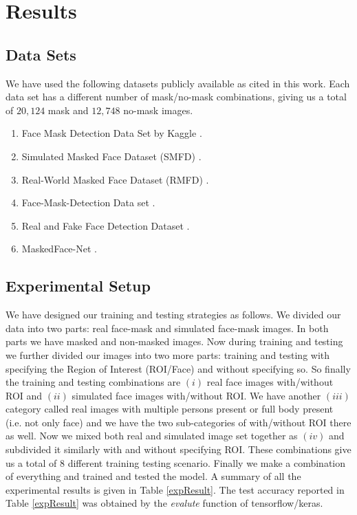 \documentclass{svproc}
\begin{document}
\section{Results}

\subsection{Data Sets}
We have used the following datasets publicly available as cited in this work. Each data set has a different number of mask/no-mask combinations, giving us a total of $20,124$ mask and $12,748$ no-mask images.
\begin{enumerate}
  \item Face Mask Detection Data Set by Kaggle \cite{kagglefacemask}. 
  \item Simulated Masked Face Dataset (SMFD) \cite{smfd}.
  \item Real-World Masked Face Dataset (RMFD) \cite{wang2020masked}.
  \item Face-Mask-Detection Data set \cite{chandrikadeb7}.
  \item Real and Fake Face Detection Dataset \cite{realAndFakeFace}.
  \item MaskedFace-Net \cite{learned2016labeled}.
\end{enumerate}

\subsection{Experimental Setup}

We have designed our training and testing strategies as follows. We divided our data into two parts: real face-mask and simulated face-mask images. In both parts we have masked and non-masked images. Now during training and testing we further divided our images into two more parts: training and testing with specifying the Region of Interest (ROI/Face) and without specifying so. So finally the training and testing combinations are $(i)$ real face images with/without ROI and $(ii)$ simulated face images with/without ROI. We have another $(iii)$ category called real images with multiple persons present or full body present (i.e. not only face) and we have the two sub-categories of with/without ROI there as well. Now we mixed both real and simulated image set together as $(iv)$ and subdivided it similarly with and without specifying ROI. These combinations give us a total of 8 different training testing scenario. Finally we make a combination of everything and trained and tested the model. A summary of all the experimental results is given in Table \ref{expResult}. The test accuracy reported in Table \ref{expResult} was obtained by the \emph{evalute} function of tensorflow/keras.
\end{document}
